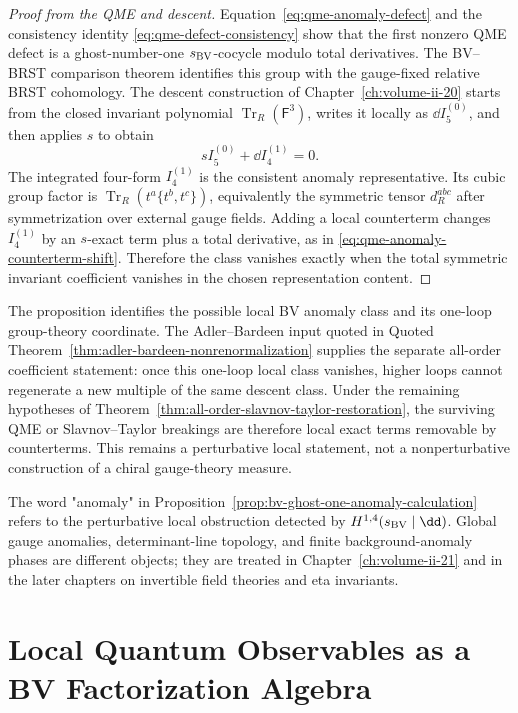\begin{proof}[Proof from the QME and descent]
Equation~\eqref{eq:qme-anomaly-defect} and the consistency identity
\eqref{eq:qme-defect-consistency} show that the first nonzero QME defect is a
ghost-number-one \(s_{\rm BV}\)-cocycle modulo total derivatives.  The
BV--BRST comparison theorem identifies this group with the gauge-fixed
relative BRST cohomology.  The descent construction of
Chapter~\ref{ch:volume-ii-20} starts from the closed invariant polynomial
\(\operatorname{Tr}_R(\mathsf F^3)\), writes it locally as
\(\dd I_5^{(0)}\), and then applies \(s\) to obtain
\[
  s I_5^{(0)}+\dd I_4^{(1)}=0 .
\]
The integrated four-form \(I_4^{(1)}\) is the consistent anomaly
representative.  Its cubic group factor is
\(\operatorname{Tr}_R(t^a\{t^b,t^c\})\), equivalently the symmetric tensor
\(d_R^{abc}\) after symmetrization over external gauge fields.  Adding a local
counterterm changes \(I_4^{(1)}\) by an \(s\)-exact term plus a total
derivative, as in \eqref{eq:qme-anomaly-counterterm-shift}.  Therefore the
class vanishes exactly when the total symmetric invariant coefficient
vanishes in the chosen representation content.
\end{proof}

The proposition identifies the possible local BV anomaly class and its
one-loop group-theory coordinate.  The Adler--Bardeen input quoted in
Quoted Theorem~\ref{thm:adler-bardeen-nonrenormalization} supplies the separate
all-order coefficient statement: once this one-loop local class vanishes,
higher loops cannot regenerate a new multiple of the same descent class.
Under the remaining hypotheses of
Theorem~\ref{thm:all-order-slavnov-taylor-restoration}, the surviving QME or
Slavnov--Taylor breakings are therefore local exact terms removable by
counterterms.  This remains a perturbative local statement, not a
nonperturbative construction of a chiral gauge-theory measure.

\begin{remark}
\label{rem:bv-ghost-one-anomaly-scope}
The word "anomaly" in Proposition~\ref{prop:bv-ghost-one-anomaly-calculation}
refers to the perturbative local
obstruction detected by \(H^{1,4}(s_{\rm BV}\mid\dd)\).  Global gauge
anomalies, determinant-line topology, and finite background-anomaly phases are
different objects; they are treated in
Chapter~\ref{ch:volume-ii-21} and in the later chapters on
invertible field theories and eta invariants.
\end{remark}

\section{Local Quantum Observables as a BV Factorization Algebra}
\label{sec:bv-factorization-algebra-boundary}

